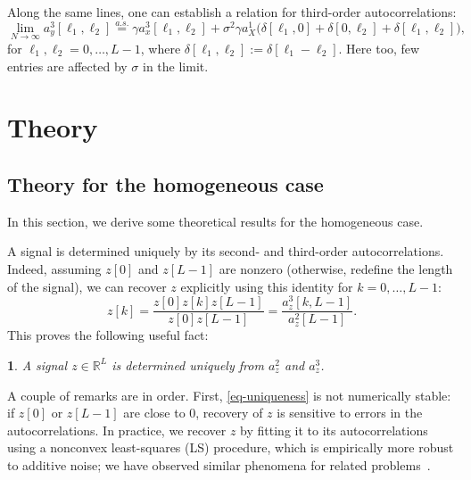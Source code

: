 \documentclass[12pt]{article}
\newcommand{\1}{\mathbf{1}}
\newcommand{\TODO}[1]{{\color{red}{[#1]}}}
\newcommand{\RL}{\mathbb{R}^L}
\newcommand{\aseq}{\stackrel{a.s.}{=}}
\theoremstyle{plain}
\theoremstyle{definition}
\theoremstyle{remark}
\theoremstyle{plain}
\theoremstyle{remark}
\theoremstyle{plain}
\theoremstyle{plain}
\theoremstyle{plain}
\newtheorem{proposition}[thm]{\protect\propositionname}
\providecommand{\propositionname}{Proposition}
\numberwithin{equation}{section}
\begin{document}
Along the same lines, one can establish a relation for third-order autocorrelations:
\begin{equation}
 \label{eq:ac3_micrograph}
\lim_{N\to\infty} a_y^3[\ell_1,\ell_2] \aseq \gamma a_{x}^3[\ell_1,\ell_2]  + \sigma^2\gamma a_{X}^1  \big(\delta[\ell_1,0]+\delta[0,\ell_2]
+\delta[\ell_1,\ell_2]\big),
\end{equation}
for $\ell_1,\ell_2 = 0, \ldots, L-1$, where $\delta[\ell_1,\ell_2]:=\delta[\ell_1-\ell_2]$.
Here too, few entries are affected by $\sigma$ in the limit.

%


\section{Theory}

\subsection{Theory for the homogeneous case} \label{sec:theory_homogeneous}
In this section, we derive some theoretical results for the homogeneous case. \TODO{Note: I am using terms interchangeably}
 
A signal is determined uniquely by its second- and third-order autocorrelations. Indeed, assuming $z[0]$ and $z[L-1]$ are nonzero (otherwise, redefine the length of the signal), we can recover $z$ explicitly using this identity for $k = 0, \ldots, L-1$:
%
\begin{equation}
%
z[k]  = \frac{z[0]z[k]z[L-1]}{z[0]z[L-1]} = \frac{a_z^3[k,L-1]}{a_z^2[L-1]}.
\label{eq-uniqueness}
%
\end{equation}
This proves the following useful fact:
\begin{proposition} \label{prop:uniqueness}
	A signal $z\in\RL$ is determined uniquely from  $a_z^2$ and $a_z^3$.
\end{proposition}

A couple of remarks are in order. First, \eqref{eq-uniqueness} is not numerically stable: if $z[0]$ or $z[L-1]$ are close to 0, recovery of $z$ is sensitive to errors in the autocorrelations. In practice, we recover $z$ by fitting it to its autocorrelations using a nonconvex least-squares (LS) procedure, which is empirically more robust to additive noise; we have observed similar phenomena for related problems~\cite{bendory2017bispectrum,boumal2017heterogeneous,abbe2017multireference}.
\end{document}
